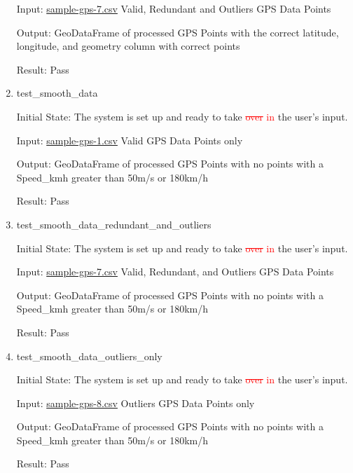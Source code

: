 \documentclass[12pt, titlepage]{article}
\begin{document}
\begin{enumerate}
    Input: \href{https://github.com/paezha/PyERT-BLACK/blob/rev0-test/quarto-example/data/sample-gps/sample-gps-7.csv}{sample-gps-7.csv} Valid, Redundant and Outliers GPS Data Points 
    
    Output: GeoDataFrame of processed GPS Points with the correct latitude, longitude, and geometry column with correct points
    
    Result: Pass

    \item{test\_smooth\_data} \label{test_smooth_data}
    
    Initial State: The system is set up and ready to take \textcolor{red}{\sout{over} in} the user’s input.

    Input: \href{https://github.com/paezha/PyERT-BLACK/blob/rev0-test/quarto-example/data/sample-gps/sample-gps-1.csv}{sample-gps-1.csv} Valid GPS Data Points only
    
    Output: GeoDataFrame of processed GPS Points with no points with a Speed\_kmh greater than 50m/s or 180km/h
    
    Result: Pass

    \item{test\_smooth\_data\_redundant\_and\_outliers} \label{test_smooth_data_redundant_and_outliers}
    
    Initial State: The system is set up and ready to take \textcolor{red}{\sout{over} in} the user’s input.

    Input: \href{https://github.com/paezha/PyERT-BLACK/blob/rev0-test/quarto-example/data/sample-gps/sample-gps-7.csv}{sample-gps-7.csv} Valid, Redundant, and Outliers GPS Data Points 
    
    Output: GeoDataFrame of processed GPS Points with no points with a Speed\_kmh greater than 50m/s or 180km/h
    
    Result: Pass

    \item{test\_smooth\_data\_outliers\_only} \label{test_smooth_data_outliers_only}
    
    Initial State: The system is set up and ready to take \textcolor{red}{\sout{over} in} the user’s input.

    Input: \href{https://github.com/paezha/PyERT-BLACK/blob/rev0-test/quarto-example/data/sample-gps/sample-gps-8.csv}{sample-gps-8.csv} Outliers GPS Data Points only
    
    Output: GeoDataFrame of processed GPS Points with no points with a Speed\_kmh greater than 50m/s or 180km/h
    
    Result: Pass
\end{enumerate}
\end{document}
